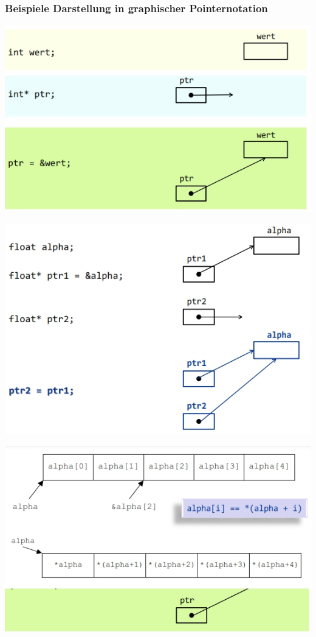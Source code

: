 	\subsubsection{Beispiele Darstellung in graphischer Pointernotation}		
		\begin{minipage}[t]{6 cm}
			\includegraphics[width=1\textwidth]{pics/pointer_beispiel_1.jpg}
		\end{minipage}	
		\begin{minipage}[t]{6 cm}
			\includegraphics[width=1\textwidth]{pics/pointer_beispiel_2.jpg}
		\end{minipage}	
		\begin{minipage}[t]{6 cm}
			\includegraphics[width=1\textwidth]{pics/pointer_beispiel_3.jpg}
		\end{minipage}
		
